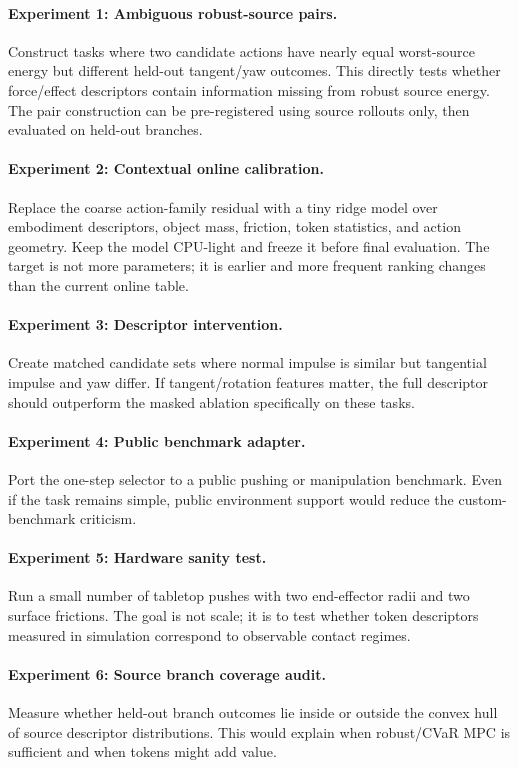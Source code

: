 \documentclass{article}
\begin{document}
\paragraph{Experiment 1: Ambiguous robust-source pairs.}
Construct tasks where two candidate actions have nearly equal worst-source energy but different held-out tangent/yaw outcomes. This directly tests whether force/effect descriptors contain information missing from robust source energy. The pair construction can be pre-registered using source rollouts only, then evaluated on held-out branches.

\paragraph{Experiment 2: Contextual online calibration.}
Replace the coarse action-family residual with a tiny ridge model over embodiment descriptors, object mass, friction, token statistics, and action geometry. Keep the model CPU-light and freeze it before final evaluation. The target is not more parameters; it is earlier and more frequent ranking changes than the current online table.

\paragraph{Experiment 3: Descriptor intervention.}
Create matched candidate sets where normal impulse is similar but tangential impulse and yaw differ. If tangent/rotation features matter, the full descriptor should outperform the masked ablation specifically on these tasks.

\paragraph{Experiment 4: Public benchmark adapter.}
Port the one-step selector to a public pushing or manipulation benchmark. Even if the task remains simple, public environment support would reduce the custom-benchmark criticism.

\paragraph{Experiment 5: Hardware sanity test.}
Run a small number of tabletop pushes with two end-effector radii and two surface frictions. The goal is not scale; it is to test whether token descriptors measured in simulation correspond to observable contact regimes.

\paragraph{Experiment 6: Source branch coverage audit.}
Measure whether held-out branch outcomes lie inside or outside the convex hull of source descriptor distributions. This would explain when robust/CVaR MPC is sufficient and when tokens might add value.
\end{document}
